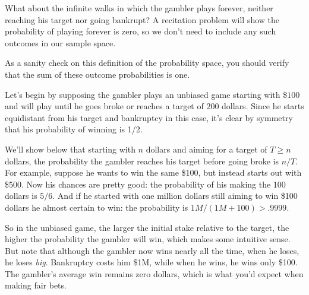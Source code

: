 \begin{editingnotes}
What about the infinite walks in which the gambler plays forever, neither
reaching his target nor going bankrupt?  A recitation problem will show the
probability of playing forever is zero, so we don't need to include any
such outcomes in our sample space.

As a sanity check on this definition of the probability space, you
should verify that the sum of these outcome probabilities is one.

\iffalse
To do this, we let $X$ be any string of $W$'s and $L$'s, and let $[X]$ be
the event consisting of the outcomes that begin with $X$.  If $X$ itself
is not an outcome but begins with an outcome, then $[X] = \emptyset$ so
$\pr{[X]} = 0$.  On the other hand, if no prefix of $X$ is an outcome,
then it's easy to verify by induction on $k$ that $\pr{[X]} = p^rq^{k-r}$.
length $k$
\fi

\end{editingnotes}



Let's begin by supposing the gambler plays an unbiased game starting
with \$$100$ and will play until he goes broke or reaches a target of
$200$ dollars.  Since he starts equidistant from his target and
bankruptcy in this case, it's clear by symmetry that his probability
of winning is 1/2.

We'll show below that starting with $n$ dollars and aiming for a
target of $T \geq n$ dollars, the probability the gambler reaches his
target before going broke is $n/T$.  For example, suppose he wants to
win the same \$100, but instead starts out with \$500.  Now his
chances are pretty good: the probability of his making the 100 dollars
is $5/6$.  And if he started with one million dollars still aiming to
win \$100 dollars he almost certain to win: the probability is $1M/(1M
+ 100) > .9999$.

So in the unbiased game, the larger the initial stake relative to the
target, the higher the probability the gambler will win, which makes
some intuitive sense.  But note that although the gambler now wins
nearly all the time, when he loses, he loses \emph{big}. Bankruptcy
costs him \$1M, while when he wins, he wins only \$100.  The gambler's
average win remains zero dollars, which is what you'd expect when
making fair bets.

